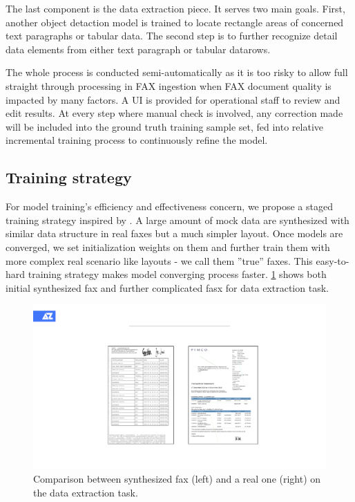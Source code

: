 \documentclass[sigconf]{acmart}
\begin{document}
The last component is the data extraction piece. It serves two main goals. First, another object detaction model is trained to locate rectangle areas of concerned text paragraphs or tabular data. The second step is to further recognize detail data elements from either text paragraph or tabular datarows. 

The whole process is conducted semi-automatically as it is too risky to allow full straight through processing in FAX ingestion when FAX document quality is impacted by many factors. A UI is provided for operational staff to review and edit results. At every step where manual check is involved, any correction made will be included into the ground truth training sample set, fed into relative incremental training process to continuously refine the model.

\subsection{Training strategy}
For model training's efficiency and effectiveness concern, we propose a staged training strategy inspired by \cite{bengio2009curriculum}. A large amount of mock data are synthesized with similar data structure in real faxes but a much simpler layout. Once models are converged, we set initialization weights on them and further train them with more complex real scenario like layouts - we call them ''true'' faxes. This easy-to-hard training strategy makes model converging process faster. \ref{figure4} shows both initial synthesized fax and further complicated fasx for data extraction task.

\begin{figure}[h]
	\centering
	\includegraphics[width=\linewidth]{figure4}
	\caption{Comparison between synthesized fax (left) and a real one (right) on the data extraction task. }
	\label{figure4}
\end{figure}
\end{document}
